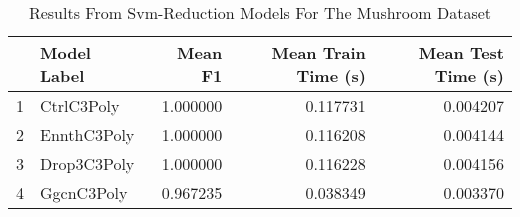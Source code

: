 \begin{table}
\centering
\caption{Results From Svm-Reduction Models For The Mushroom Dataset}
\label{tab:svm_reduction_results_mushroom}
\begin{tabular}{rlrrr}
\toprule
 & Model Label & Mean F1 & Mean Train Time (s) & Mean Test Time (s) \\
\midrule
1 & CtrlC3Poly & 1.000000 & 0.117731 & 0.004207 \\
2 & EnnthC3Poly & 1.000000 & 0.116208 & 0.004144 \\
3 & Drop3C3Poly & 1.000000 & 0.116228 & 0.004156 \\
4 & GgcnC3Poly & 0.967235 & 0.038349 & 0.003370 \\
\bottomrule
\end{tabular}
\end{table}
